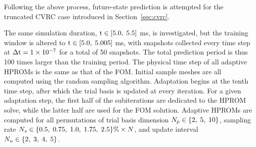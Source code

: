 Following the above process, future-state prediction is attempted for the truncated CVRC case introduced in Section~\ref{sec:cvrc}. 

The same simulation duration, $\text{t} \in [5.0, \; 5.5]$ ms, is investigated, but the training window is altered to $\text{t} \in [5.0, \; 5.005]$ ms, with snapshots collected every time step at $\Delta \text{t} = 1 \times 10^{-7}$ for a total of 50 snapshots. The total prediction period is thus 100 times larger than the training period. The physical time step of all adaptive HPROMs is the same as that of the FOM. Initial sample meshes are all computed using the random sampling algorithm. Adaptation begins at the tenth time step, after which the trial basis is updated at every iteration. For a given adaptation step, the first half of the subiterations are dedicated to the HPROM solve, while the latter half are used for the FOM solution. Adaptive HPROMs are computed for all permutations of trial basis dimension $N_p \in \{2, \; 5, \; 10\}$, sampling rate $N_s \in \{0.5, \; 0.75, \; 1.0, \; 1.75, \; 2.5\}\% \times N$, and update interval $N_u \in \{2, \; 3, \; 4, \; 5\}$. 

